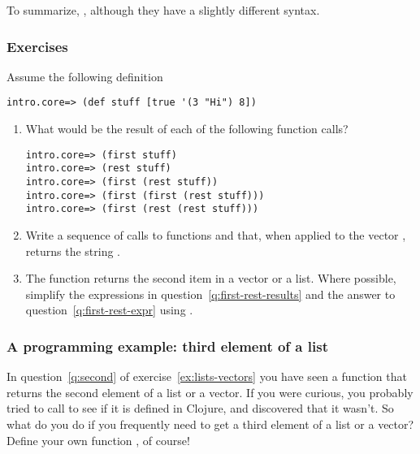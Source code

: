 To summarize, , although they have a slightly different syntax.  

\subsubsection{Exercises}\label{subsub:lists-vectors-exercises}
\begin{exercise}\label{ex:lists-vectors}
Assume the following definition
\begin{framed}
\begin{verbatim}
intro.core=> (def stuff [true '(3 "Hi") 8])
\end{verbatim}
\end{framed}
\begin{enumerate}
\item\label{q:first-rest-results} What would be the result of each of the following function calls? 
\begin{framed}
\begin{verbatim}
intro.core=> (first stuff)
intro.core=> (rest stuff)
intro.core=> (first (rest stuff))
intro.core=> (first (first (rest stuff)))
intro.core=> (first (rest (rest stuff)))
\end{verbatim}
\end{framed}
\item\label{q:first-rest-expr} Write a sequence of calls to functions  and  that, when applied to the vector , returns the string . 
\item\label{q:second} The function  returns the second item in a vector or a list. Where possible, simplify the expressions in question~\ref{q:first-rest-results} and the answer to question~\ref{q:first-rest-expr} using .
\end{enumerate}
\end{exercise}

\subsubsection{A programming example: third element of a list}\label{subsubsec:third}
In question~\ref{q:second} of exercise~\ref{ex:lists-vectors} you have seen a function  that returns the second element of a list or a vector. If you were curious, you probably tried to call  to see if it is defined in Clojure, and discovered that it wasn't. So what do you do if you frequently need to get a third element of a list or a vector? Define your own function , of course! 

